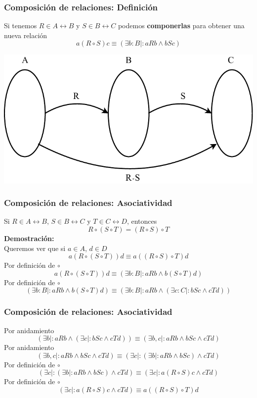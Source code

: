 \documentclass{beamer}
\begin{document}
\begin{frame}[fragile]
    \frametitle{Composición de relaciones: Definición}
    Si tenemos $R \in A \leftrightarrow B$ y $S \in B \leftrightarrow C$ podemos \textbf{componerlas} para obtener una nueva relación
    $$a (R \circ S) c \equiv (\exists b: B \mid : aRb \land bSc)$$
    \begin{center}
        \includegraphics[width=0.7\linewidth]{images/composition.pdf}
    \end{center}
\end{frame}

\begin{frame}[fragile]
    \frametitle{Composición de relaciones: Asociatividad} 
    Si $R \in A \leftrightarrow B$, $S \in B \leftrightarrow C$ y $T \in C \leftrightarrow D$, entonces
    $$R \circ (S \circ T) = (R \circ S) \circ T$$
    \textbf{Demostración:} \\
    Queremos ver que si $a \in A$, $d \in D$
    $$a (R \circ (S \circ T)) d \equiv a ((R \circ S) \circ T) d$$
    Por definición de $\circ$
    $$a (R \circ (S \circ T)) d \equiv (\exists b: B \mid : a R b \land b (S \circ T) d)$$
    Por definición de $\circ$
    $$(\exists b: B \mid : a R b \land b (S \circ T) d) \equiv (\exists b: B \mid : a R b \land (\exists c: C \mid : bSc \land cTd))$$
\end{frame}

\begin{frame}[fragile]
    \frametitle{Composición de relaciones: Asociatividad} 
    Por anidamiento
    $$(\exists b \mid : a R b \land (\exists c \mid : bSc \land cTd)) \equiv (\exists b, c \mid : a R b \land bSc \land cTd)$$
    Por anidamiento
    $$(\exists b, c \mid : a R b \land bSc \land cTd) \equiv (\exists c \mid : (\exists b \mid : aRb \land bSc) \land cTd)$$
    Por definición de $\circ$
    $$(\exists c \mid : (\exists b \mid : aRb \land bSc) \land cTd) \equiv (\exists c \mid : a(R \circ S)c \land cTd)$$
    Por definición de $\circ$
    $$(\exists c \mid : a(R \circ S)c \land cTd) \equiv a((R \circ S) \circ T)d$$
\end{frame}
\end{document}
